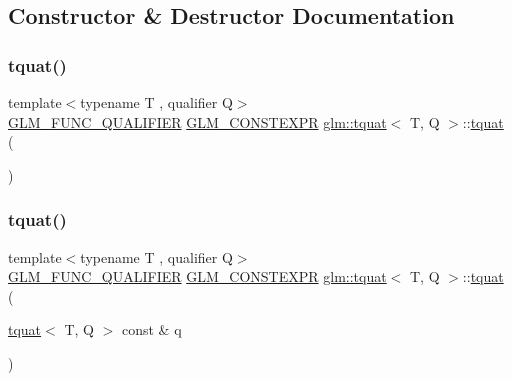 \subsection{Constructor \& Destructor Documentation}
\mbox{\label{structglm_1_1tquat_a5ddc2ac5c094aa455d5dc896a1acf686}} 
\subsubsection{\texorpdfstring{tquat()}{tquat()}\hspace{0.1cm}{\footnotesize\ttfamily [1/12]}}
{\footnotesize\ttfamily template$<$typename T , qualifier Q$>$ \\
\mbox{\hyperlink{setup_8hpp_a33fdea6f91c5f834105f7415e2a64407}{G\+L\+M\+\_\+\+F\+U\+N\+C\+\_\+\+Q\+U\+A\+L\+I\+F\+I\+ER}} \mbox{\hyperlink{setup_8hpp_a08b807947b47031d3a511f03f89645ad}{G\+L\+M\+\_\+\+C\+O\+N\+S\+T\+E\+X\+PR}} \mbox{\hyperlink{structglm_1_1tquat}{glm\+::tquat}}$<$ T, Q $>$\+::\mbox{\hyperlink{structglm_1_1tquat}{tquat}} (\begin{DoxyParamCaption}{ }\end{DoxyParamCaption})}

\mbox{\label{structglm_1_1tquat_a2711d3970e6aeeade71debf8a9b5c012}} 
\subsubsection{\texorpdfstring{tquat()}{tquat()}\hspace{0.1cm}{\footnotesize\ttfamily [2/12]}}
{\footnotesize\ttfamily template$<$typename T , qualifier Q$>$ \\
\mbox{\hyperlink{setup_8hpp_a33fdea6f91c5f834105f7415e2a64407}{G\+L\+M\+\_\+\+F\+U\+N\+C\+\_\+\+Q\+U\+A\+L\+I\+F\+I\+ER}} \mbox{\hyperlink{setup_8hpp_a08b807947b47031d3a511f03f89645ad}{G\+L\+M\+\_\+\+C\+O\+N\+S\+T\+E\+X\+PR}} \mbox{\hyperlink{structglm_1_1tquat}{glm\+::tquat}}$<$ T, Q $>$\+::\mbox{\hyperlink{structglm_1_1tquat}{tquat}} (\begin{DoxyParamCaption}\item[{\mbox{\hyperlink{structglm_1_1tquat}{tquat}}$<$ T, Q $>$ const \&}]{q }\end{DoxyParamCaption})}

